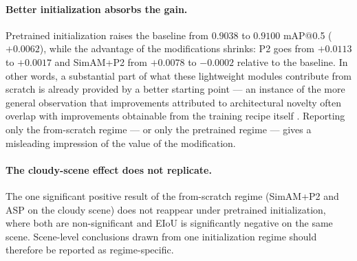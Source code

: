 \documentclass[pdflatex,sn-basic,Numbered]{sn-jnl}%
\begin{document}
\paragraph{Better initialization absorbs the gain.} Pretrained initialization raises the baseline from $0.9038$ to $0.9100$ mAP@0.5 ($+0.0062$), while the advantage of the modifications shrinks: P2 goes from $+0.0113$ to $+0.0017$ and SimAM+P2 from $+0.0078$ to $-0.0002$ relative to the baseline. In other words, a substantial part of what these lightweight modules contribute from scratch is already provided by a better starting point --- an instance of the more general observation that improvements attributed to architectural novelty often overlap with improvements obtainable from the training recipe itself \cite{he2019bag}. Reporting only the from-scratch regime --- or only the pretrained regime --- gives a misleading impression of the value of the modification.

\paragraph{The cloudy-scene effect does not replicate.} The one significant positive result of the from-scratch regime (SimAM+P2 and ASP on the cloudy scene) does not reappear under pretrained initialization, where both are non-significant and EIoU is significantly negative on the same scene. Scene-level conclusions drawn from one initialization regime should therefore be reported as regime-specific.
\end{document}
